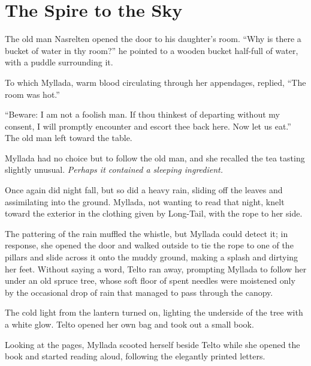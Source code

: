 \chapter{The Spire to the Sky}

The old man Nasrelten opened the door to his daughter's room. ``Why is there a bucket of water in thy room?'' he pointed to a wooden bucket half-full of water, with a puddle surrounding it.

To which Myllada, warm blood circulating through her appendages, replied, ``The room was hot.''

``Beware: I am not a foolish man. If thou thinkest of departing without my consent, I will promptly encounter and escort thee back here. Now let us eat.'' The old man left toward the table.

Myllada had no choice but to follow the old man, and she recalled the tea tasting slightly unusual. \emph{Perhaps it contained a sleeping ingredient.}

\centeredstars

Once again did night fall, but so did a heavy rain, sliding off the leaves and assimilating into the ground. Myllada, not wanting to read that night, knelt toward the exterior in the clothing given by Long-Tail, with the rope to her side.

The pattering of the rain muffled the whistle, but Myllada could detect it; in response, she opened the door and walked outside to tie the rope to one of the pillars and slide across it onto the muddy ground, making a splash and dirtying her feet. Without saying a word, Telto ran away, prompting Myllada to follow her under an old spruce tree, whose soft floor of spent needles were moistened only by the occasional drop of rain that managed to pass through the canopy.

The cold light from the lantern turned on, lighting the underside of the tree with a white glow. Telto opened her own bag and took out a small book.

Looking at the pages, Myllada scooted herself beside Telto while she opened the book and started reading aloud, following the elegantly printed letters.

